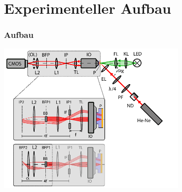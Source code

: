 \documentclass[aspectratio=1610]{beamer}
\begin{document}
	\section{Experimenteller Aufbau}
	\begin{frame}
		\frametitle{Aufbau}
		\begin{center}
				\includegraphics[width=0.7\textwidth]{figures/Aufbau_Schema.pdf}	
		\end{center}
	\end{frame}
	
\end{document}
